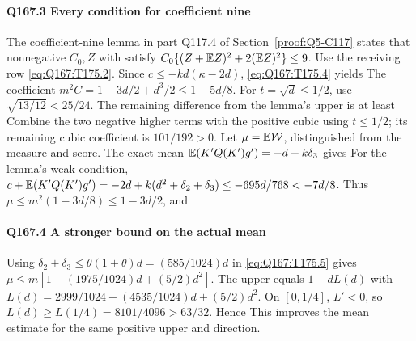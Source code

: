 \paragraph{Q167.3 Every condition for coefficient nine}\label{part:Q167.3}
The coefficient-nine lemma in part Q117.4 of
Section~\ref{proof:Q5-C117} states that nonnegative $C_0,\allowbreak Z$ with
satisfy $C_0\{(Z+\mathbb E Z)^2+2(\mathbb E Z)^2\}\le\allowbreak 9$.
Use the receiving row \eqref{eq:Q167:T175.2}.
Since $c\le\allowbreak -kd(\kappa-2d)$, \eqref{eq:Q167:T175.4} yields
The coefficient $m^2C=\allowbreak 1-3d/2+d^3/2\le\allowbreak 1-5d/8$.
For $t=\allowbreak \sqrt d\le\allowbreak 1/2$, use $\sqrt{13/12}<\allowbreak 25/24$.
The remaining difference from the lemma's upper is at least
Combine the two negative higher terms with the positive cubic using
$t\le\allowbreak 1/2$; its remaining cubic coefficient is $101/192>\allowbreak 0$.
Let $\mu=\allowbreak \mathbb E\mathcal W$, distinguished from the measure and score.
The exact mean $\mathbb E(K'Q(K')g')=\allowbreak -d+k\delta_3$ gives
For the lemma's weak condition,
$c+\mathbb E(K'Q(K')g')=-2d+k(d^2+\delta_2+\delta_3)
\le-695d/768<-7d/8$.
Thus $\mu\le\allowbreak  m^2(1-3d/8)\le\allowbreak 1-3d/2$, and

\paragraph{Q167.4 A stronger bound on the actual mean}\label{part:Q167.4}
Using $\delta_2+\delta_3\le\allowbreak \theta(1+\theta)d=\allowbreak (585/1024)d$ in
\eqref{eq:Q167:T175.5} gives
$\mu\le\allowbreak  m[1-(1975/1024)d+(5/2)d^2]$.
The upper equals $1-dL(d)$ with
$L(d)=\allowbreak 2999/1024-(4535/1024)d+(5/2)d^2$.
On $[0,\allowbreak 1/4]$, $L'<\allowbreak 0$, so $L(d)\ge\allowbreak  L(1/4)=\allowbreak 8101/4096>\allowbreak 63/32$.
Hence
This improves the mean estimate for the same positive upper and direction.


